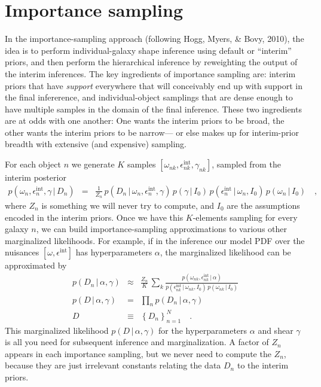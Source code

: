 \documentclass[12pt]{article}
\newcommand{\given}{\,|\,}
\newcommand{\data}{D}
\newcommand{\shear}{\gamma}
\newcommand{\ellip}{\epsilon}
\newcommand{\intrinsic}{\ellip^{\mathrm{int}}}
\newcommand{\prior}{I}
\newcommand{\nspars}{\omega}
\newcommand{\hyperpars}{\alpha}
\newcommand{\setof}[1]{\left\{{#1}\right\}}
\begin{document}
\section{Importance sampling}

In the importance-sampling approach (following Hogg, Myers, \& Bovy, 2010),
  the idea is to perform individual-galaxy shape inference using default or ``interim'' priors,
  and then perform the hierarchical inference by reweighting the output of the interim inferences.
The key ingredients of importance sampling are:
  interim priors that have \emph{support} everywhere that will conceivably end up with support in the final infererence,
  and individual-object samplings that are dense enough to have multiple samples in the domain of the final inference.
These two ingredients are at odds with one another:
One wants the interim priors to be broad,
  the other wants the interim priors to be narrow---%
  or else makes up for interim-prior breadth with extensive (and expensive) sampling.

For each object $n$ we generate $K$ samples $[\nspars_{nk},\intrinsic_{nk},\shear_{nk}]$,
   sampled from the interim posterior
\begin{eqnarray}
p(\nspars_n,\intrinsic_n,\shear\given\data_n)
  &=& \frac{1}{Z_n}\,p(\data_n\given\nspars_n,\intrinsic_n,\shear)\,p(\shear\given\prior_0)\,p(\intrinsic_n\given\nspars_n,\prior_0)\,p(\nspars_n\given\prior_0)
  \quad ,
\end{eqnarray}
  where $Z_n$ is something we will never try to compute,
  and $\prior_0$ are the assumptions encoded in the interim priors.
Once we have this $K$-elements sampling for every galaxy $n$,
  we can build importance-sampling approximations to various other marginalized likelihoods.
For example, if in the inference our model PDF over the nuisances  $[\nspars,\intrinsic]$ has hyperparameters $\hyperpars$,
  the marginalized likelihood can be approximated by
\begin{eqnarray}
p(\data_n\given\hyperpars,\shear)
  &\approx& \frac{Z_n}{K}\,\sum_k \frac{p(\nspars_{nk},\intrinsic_{nk}\given\hyperpars)}{p(\intrinsic_{nk}\given\nspars_{nk},\prior_0)\,p(\nspars_{nk}\given\prior_0)}
  \\
p(\data\given\hyperpars,\shear)
  &=& \prod_n p(\data_n\given\hyperpars,\shear)
  \\
\data
  &\equiv& \setof{\data_n}_{n=1}^N
  \quad .
\end{eqnarray}
This marginalized likelihood $p(\data\given\hyperpars,\shear)$ for the hyperparameters $\alpha$ and shear $\shear$
  is all you need for subsequent inference and marginalization.
A factor of $Z_n$ appears in each importance sampling,
  but we never need to compute the $Z_n$, because they are just irrelevant constants
  relating the data $D_n$ to the interim priors.
\end{document}
